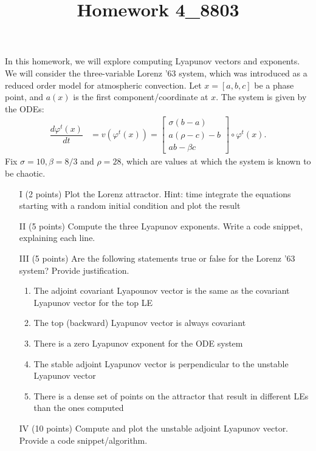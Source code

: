 \documentclass[12pt]{article}
\title{Homework 4_8803}
\begin{document}
\MakeScribeTop


In this homework, we will explore computing Lyapunov vectors and exponents. We will consider the three-variable Lorenz '63 system, which was introduced as a reduced order model for atmospheric convection. Let $x = [a,b,c]$ be a phase point, and $a(x)$ is the first component/coordinate at $x.$ The system is given by the ODEs:
\begin{align}
	\dfrac{d\varphi^t(x)}{dt} &= v(\varphi^t(x)) = \begin{bmatrix}
	\sigma(b - a) \\
	a(\rho - c) - b \\
	ab  - \beta c
	\end{bmatrix} \circ \varphi^t(x).
\end{align}
Fix $\sigma = 10, \beta = 8/3$ and $\rho = 28$, which are values at which the system is known to be chaotic. 
\begin{enumerate}
	\item[I] (2 points) Plot the Lorenz attractor. Hint: time integrate the equations starting with a random initial condition and plot the result
	\item[II] (5 points) Compute the three Lyapunov exponents. Write a code snippet, explaining each line.

	\item[III] (5 points) Are the following statements true or false for the Lorenz '63 system? Provide justification.
		\begin{enumerate}
			\item The adjoint covariant Lyapounov vector is the same as the covariant Lyapunov vector for the top LE
			\item The top (backward) Lyapunov vector is always covariant
			\item There is a zero Lyapunov exponent for the ODE system
			\item The stable adjoint Lyapunov vector is perpendicular to the unstable Lyapunov vector 
			\item There is a dense set of points on the attractor that result in different LEs than the ones computed
		\end{enumerate}
	\item[IV] (10 points) Compute and plot the unstable adjoint Lyapunov vector. Provide a code snippet/algorithm.

\end{enumerate}
\end{document}
